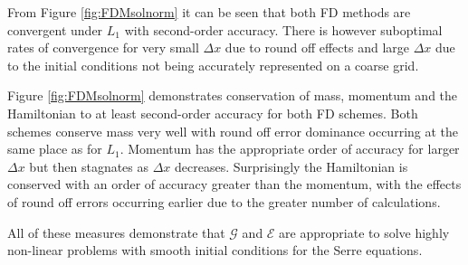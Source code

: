 \documentclass[SingleSpace,12pt,Proceedings]{Serre_ASCE}
\begin{document}
%
From Figure \ref{fig:FDMsolnorm} it can be seen that both FD methods are convergent under $L_1$ with second-order accuracy. There is however suboptimal rates of convergence for very small $\Delta x$ due to round off effects and large $\Delta x$ due to the initial conditions not being accurately represented on a coarse grid.  

Figure \ref{fig:FDMsolnorm} demonstrates conservation of mass, momentum and the Hamiltonian to at least second-order accuracy for both FD schemes. Both schemes conserve mass very well with round off error dominance occurring at the same place as for $L_1$. Momentum has the appropriate order of accuracy for larger $\Delta x$ but then stagnates as $\Delta x$ decreases. Surprisingly the Hamiltonian is conserved with an order of accuracy greater than the momentum, with the effects of round off errors occurring earlier due to the greater number of calculations.

All of these measures demonstrate that $\mathcal{G}$ and $\mathcal{E}$ are appropriate to solve highly non-linear problems with smooth initial conditions for the Serre equations. 

\end{document}
